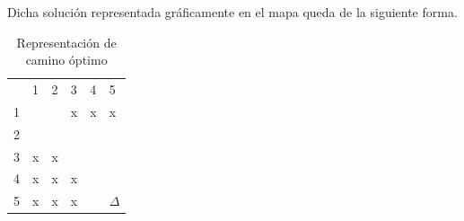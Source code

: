 \documentclass[journal, 10pt]{IEEEtran}
\begin{document}
Dicha solución representada gráficamente en el mapa queda de la siguiente forma.
\begin{table}[H]
\centering
\begin{tabular}{llllll}
                       & 1                                                                     & 2                                             & 3                                             & 4                                             & 5                                                     \\ \cline{2-6} 
\multicolumn{1}{l|}{1} & \multicolumn{1}{l|}{\cellcolor[HTML]{32CB00}{\color[HTML]{000000} O}} & \multicolumn{1}{l|}{\cellcolor[HTML]{32CB00}} & \multicolumn{1}{l|}{x}                        & \multicolumn{1}{l|}{x}                        & \multicolumn{1}{l|}{x}                                \\ \cline{2-6} 
\multicolumn{1}{l|}{2} & \multicolumn{1}{l|}{}                                                 & \multicolumn{1}{l|}{\cellcolor[HTML]{32CB00}} & \multicolumn{1}{l|}{\cellcolor[HTML]{32CB00}} & \multicolumn{1}{l|}{}                         & \multicolumn{1}{l|}{}                                 \\ \cline{2-6} 
\multicolumn{1}{l|}{3} & \multicolumn{1}{l|}{x}                                                & \multicolumn{1}{l|}{x}                        & \multicolumn{1}{l|}{\cellcolor[HTML]{32CB00}} & \multicolumn{1}{l|}{\cellcolor[HTML]{32CB00}} & \multicolumn{1}{l|}{\cellcolor[HTML]{32CB00}}         \\ \cline{2-6} 
\multicolumn{1}{l|}{4} & \multicolumn{1}{l|}{x}                                                & \multicolumn{1}{l|}{x}                        & \multicolumn{1}{l|}{x}                        & \multicolumn{1}{l|}{}                         & \multicolumn{1}{l|}{\cellcolor[HTML]{32CB00}}         \\ \cline{2-6} 
\multicolumn{1}{l|}{5} & \multicolumn{1}{l|}{x}                                                & \multicolumn{1}{l|}{x}                        & \multicolumn{1}{l|}{x}                        & \multicolumn{1}{l|}{}                         & \multicolumn{1}{l|}{\cellcolor[HTML]{32CB00}$\Delta$} \\ \cline{2-6} 
\end{tabular}
\caption{Representación de camino óptimo}
\end{table}
\end{document}
